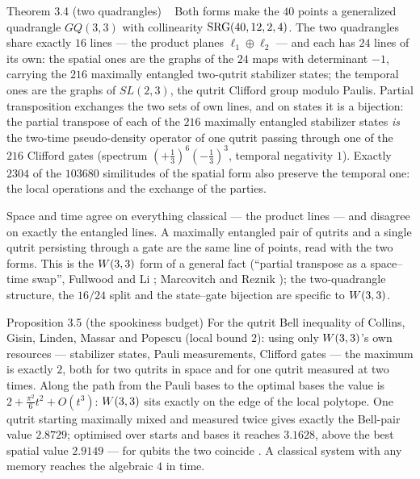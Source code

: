 \begin{result}{Theorem 3.4 (two quadrangles) \hfill \tierT\ \tierC}
Both forms make the $40$ points a generalized quadrangle $GQ(3,3)$ with collinearity $\mathrm{SRG}(40,12,2,4)$. The two
quadrangles share exactly $16$ lines --- the product planes $\ell_1\oplus\ell_2$ --- and each has $24$ lines of its
own: the spatial ones are the graphs of the $24$ maps with determinant $-1$, carrying the $216$ maximally entangled
two-qutrit stabilizer states; the temporal ones are the graphs of $SL(2,3)$, the qutrit Clifford group modulo Paulis.
Partial transposition exchanges the two sets of own lines, and on states it is a bijection: the partial transpose of
each of the $216$ maximally entangled stabilizer states \emph{is} the two-time pseudo-density operator of one qutrit
passing through one of the $216$ Clifford gates (spectrum $(+\tfrac13)^6(-\tfrac13)^3$, temporal negativity $1$).
Exactly $2304$ of the $103680$ similitudes of the spatial form also preserve the temporal one: the local operations
and the exchange of the parties.
\end{result}

\begin{physical}
Space and time agree on everything classical --- the product lines --- and disagree on exactly the entangled lines. A
maximally entangled pair of qutrits and a single qutrit persisting through a gate are the same line of points, read
with the two forms. This is the $W(3,3)$ form of a general fact (``partial transpose as a space--time swap'',
Fullwood and Li \cite{FullwoodLi}; Marcovitch and Reznik \cite{MarcovitchReznik}); the two-quadrangle structure, the
$16/24$ split and the state--gate bijection are specific to $W(3,3)$.
\end{physical}

\begin{result}{Proposition 3.5 (the spookiness budget) \hfill \tierC}
For the qutrit Bell inequality of Collins, Gisin, Linden, Massar and Popescu \cite{CGLMP} (local bound $2$):
using only $W(3,3)$'s own resources --- stabilizer states, Pauli measurements, Clifford gates --- the maximum is exactly
$2$, both for two qutrits in space and for one qutrit measured at two times. Along the path from the Pauli bases to the
optimal bases the value is $2+\tfrac{\pi^2}{6}t^2+O(t^3)$: $W(3,3)$ sits exactly on the edge of the local polytope. One
qutrit starting maximally mixed and measured twice gives exactly the Bell-pair value $2.8729$; optimised over starts and
bases it reaches $3.1628$, above the best spatial value $2.9149$ \cite{ADGL} --- for qubits the two coincide
\cite{Fritz2010}. A classical system with any memory reaches the algebraic $4$ in time.
\end{result}

